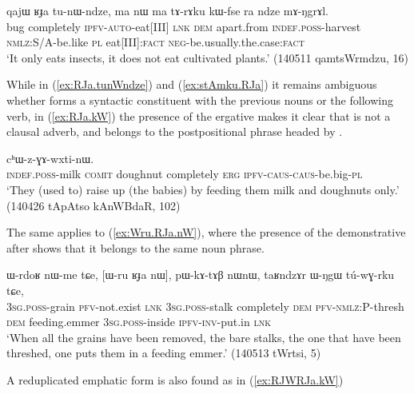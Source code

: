 \begin{exe}
\ex \label{ex:RJa.tunWndze}
 \gll qajɯ ʁɟa tu-nɯ-ndze, ma nɯ ma tɤ-rɤku kɯ-fse ra ndze mɤ-ŋgrɤl. \\
 bug completely \textsc{ipfv}-\textsc{auto}-eat[III] \textsc{lnk} \textsc{dem} apart.from \textsc{indef}.\textsc{poss}-harvest \textsc{nmlz}:S/A-be.like \textsc{pl} eat[III]:\textsc{fact} \textsc{neg}-be.usually.the.case:\textsc{fact} \\ 
\glt `It only eats insects, it does not eat cultivated plants.' (140511 qamtsWrmdzu, 16)
\end{exe}

While in (\ref{ex:RJa.tunWndze})  and (\ref{ex:stAmku.RJa}) it remains ambiguous whether  forms a syntactic constituent with the previous nouns or the following verb, in (\ref{ex:RJa.kW}) the presence of the ergative makes it clear that  is not a clausal adverb, and belongs to the postpositional phrase headed by .

\begin{exe}
\ex \label{ex:RJa.kW}
  cʰɯ-z-ɣɤ-wxti-nɯ. \\
 \textsc{indef}.\textsc{poss}-milk \textsc{comit} doughnut completely \textsc{erg} \textsc{ipfv}-\textsc{caus}-\textsc{caus}-be.big-\textsc{pl} \\
\glt `They (used to) raise up (the babies) by feeding them milk and doughnuts only.' (140426 tApAtso kAnWBdaR, 102)
\end{exe}

The same applies to (\ref{ex:Wru.RJa.nW}), where the presence of the demonstrative  after  shows that it belongs to the same noun phrase.

\begin{exe}
\ex \label{ex:Wru.RJa.nW}
 \gll ɯ-rdoʁ nɯ-me tɕe, [ɯ-ru ʁɟa nɯ], pɯ-kɤ-tɤβ nɯnɯ, taʁndzɤr ɯ-ŋgɯ tú-wɣ-rku tɕe, \\
 \textsc{3sg}.\textsc{poss}-grain \textsc{pfv}-not.exist \textsc{lnk} \textsc{3sg}.\textsc{poss}-stalk completely \textsc{dem} \textsc{pfv}-\textsc{nmlz}:P-thresh \textsc{dem} feeding.emmer \textsc{3sg}.\textsc{poss}-inside \textsc{ipfv}-\textsc{inv}-put.in \textsc{lnk} \\
 \glt `When all the grains have been removed, the bare stalks, the one that have been threshed, one puts them in a feeding emmer.' (140513 tWrtsi, 5)
\end{exe}

A reduplicated emphatic form  is also found as in (\ref{ex:RJWRJa.kW})

